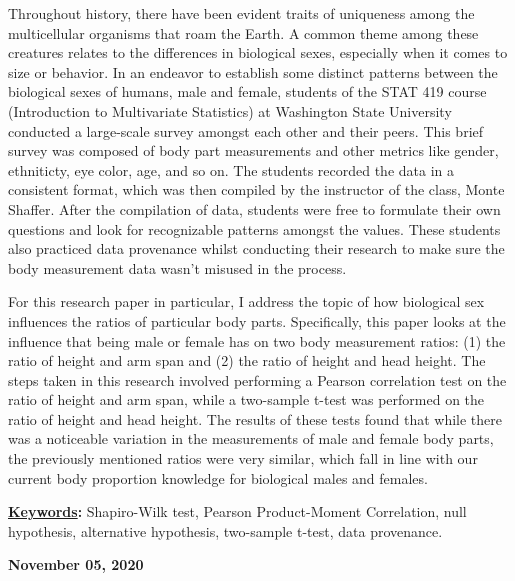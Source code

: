 \documentclass[]{article}
\renewenvironment{abstract}
 {{%
    \setlength{\leftmargin}{0mm}
    \setlength{\rightmargin}{\leftmargin}%
  }%
  \relax}
 {\endlist}
\begin{document}
\begin{abstract}

    \hbox{\vrule height .2pt width 39.14pc}

    \vskip 8.5pt %

\noindent Throughout history, there have been evident traits of
uniqueness among the multicellular organisms that roam the Earth. A
common theme among these creatures relates to the differences in
biological sexes, especially when it comes to size or behavior. In an
endeavor to establish some distinct patterns between the biological
sexes of humans, male and female, students of the STAT 419 course
(Introduction to Multivariate Statistics) at Washington State University
conducted a large-scale survey amongst each other and their peers. This
brief survey was composed of body part measurements and other metrics
like gender, ethniticty, eye color, age, and so on. The students
recorded the data in a consistent format, which was then compiled by the
instructor of the class, Monte Shaffer. After the compilation of data,
students were free to formulate their own questions and look for
recognizable patterns amongst the values. These students also practiced
data provenance whilst conducting their research to make sure the body
measurement data wasn't misused in the process.

\vspace{0.25cm}

For this research paper in particular, I address the topic of how
biological sex influences the ratios of particular body parts.
Specifically, this paper looks at the influence that being male or
female has on two body measurement ratios: (1) the ratio of height and
arm span and (2) the ratio of height and head height. The steps taken in
this research involved performing a Pearson correlation test on the
ratio of height and arm span, while a two-sample t-test was performed on
the ratio of height and head height. The results of these tests found
that while there was a noticeable variation in the measurements of male
and female body parts, the previously mentioned ratios were very
similar, which fall in line with our current body proportion knowledge
for biological males and females.


\vskip 8.5pt \noindent \textbf{\underline{Keywords}:} Shapiro-Wilk test,
Pearson Product-Moment Correlation, null hypothesis, alternative
hypothesis, two-sample t-test, data provenance. \par

    




    
    \hbox{\vrule height .2pt width 39.14pc}
    \vskip 5pt 
    \hfill \textbf{\textcolor{WSU.gray}{ November 05, 2020 } }
    \vskip 5pt 
    
\end{abstract}
\end{document}
